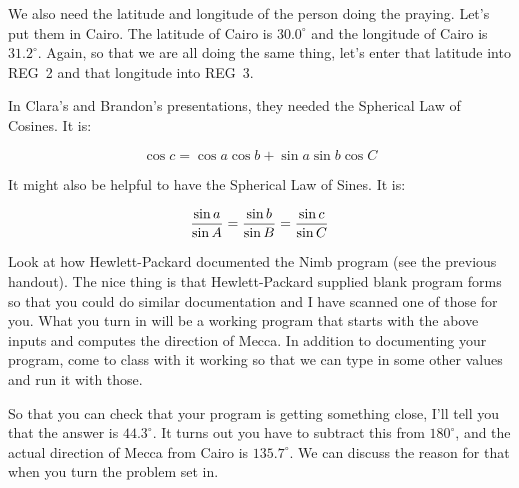 We also need the latitude and longitude of the person doing the praying. Let's put them in Cairo. The latitude of Cairo is $30.0^{\circ}$ and the longitude of Cairo is $31.2^{\circ}$. Again, so that we are all doing the same thing, let's enter that latitude into REG~2 and that longitude into REG~3.

In Clara's and Brandon's presentations, they needed the Spherical Law of Cosines. It is:

$$\cos c = \cos a \cos b + \sin a \sin b \cos C$$

\noindent It might also be helpful to have the Spherical Law of Sines. It is:

$${\sin a \over \sin A} = {\sin b \over \sin B} = {\sin c \over \sin C}$$

\nobreak\bigskip

\noindent Look at how Hewlett-Packard documented the Nimb program (see the previous handout). The nice thing is that Hewlett-Packard supplied blank program forms so that you could do similar documentation and I have scanned one of those for you. What you turn in will be a working program that starts with the above inputs and computes the direction of Mecca. In addition to documenting your program, come to class with it working so that we can type in some other values and run it with those.

So that you can check that your program is getting something close, I'll tell you that the answer is $44.3^{\circ}$. It turns out you have to subtract this from $180^{\circ}$, and the actual direction of Mecca from Cairo is $135.7^{\circ}$. We can discuss the reason for that when you turn the problem set in.

\bye
